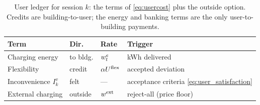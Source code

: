 \begin{table}[t]
\centering\tablesize
\caption{User ledger for session $k$: the terms of \eqref{eq:usercost}
plus the outside option. Credits are building-to-user; the energy and
banking terms are the only user-to-building payments.}
\label{tab:usercost}
\begin{tabular}{@{}llll@{}}
\toprule
Term & Dir. & Rate & Trigger \\
\midrule
Charging energy & to bldg. & $w_{t}^{e}$ & kWh delivered \\
Flexibility & credit & $\alpha U^{\mathrm{flex}}$ & accepted deviation \\
Inconvenience $I^v_k$ & felt & --- & acceptance criteria \eqref{eq:user_satisfaction} \\
External charging & outside & $w^{\mathrm{ext}}$ & reject-all (price floor) \\
\bottomrule
\end{tabular}
\end{table}